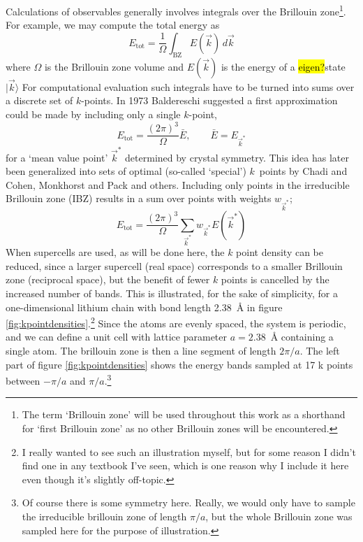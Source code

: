 \documentclass[11pt,bibliography=totoc,index=totoc]{scrbook}   %
\newcommand{\comment}[1]{\hl{#1}}
\begin{document}
Calculations of observables generally involves integrals over the Brillouin zone\footnote{The term `Brillouin zone' will be used throughout this work as
a shorthand for `first Brillouin zone' as no other Brillouin zones will be encountered.}. 
For example, we may compute the total energy as
\begin{equation}
  E_{\text{tot}} = \frac{1}{\Omega} \int_{\text{BZ}} E(\vec{k}) \,d\vec{k}
\end{equation}
where $\Omega$ is the Brillouin zone volume and $E(\vec{k})$ is the energy of a \comment{eigen?}state $|\vec{k}\rangle$
For computational evaluation such integrals have to be turned into sums over a discrete set of $k$-points. 
In 1973 Baldereschi suggested a first approximation could be made by including only a single $k$-point,
\begin{equation}
  E_{\text{tot}} = \frac{(2\pi)^3}{\Omega} \bar{E}, \qquad \bar{E}=E_{\vec{k}^*}
\end{equation}
for a `mean value point' $\vec{k}^*$ determined by crystal symmetry\cite{Baldereschi:1973}. 
This idea has later been generalized into sets of optimal (so-called `special') $k$~points by Chadi and Cohen\cite{Chadi:1973},
Monkhorst and Pack\cite{MonkhorstPack:1976} and others.
Including only points in the irreducible Brillouin zone (IBZ) results in a sum over points with weights $w_{\vec{k}^*}$;
\begin{equation}
  E_{\text{tot}} = \frac{(2\pi)^3}{\Omega}\sum_{\vec{k}^*} w_{\vec{k}^*} E(\vec{k}^*)
\end{equation}
When supercells are used, as will be done here, the $k$ point density can be reduced, since a larger supercell (real space) corresponds to a smaller Brillouin zone (reciprocal space), but the benefit of fewer $k$ points is cancelled by the increased number of bands. 
This is illustrated, for the sake of simplicity, for a one-dimensional 
lithium chain with bond length 2.38~Å in figure \ref{fig:kpointdensities}.\footnote{I really wanted to see such an illustration myself, 
but for some reason I didn't find one in any textbook I've seen, which is one reason why I include it here even though it's slightly off-topic.}
Since the atoms are evenly spaced,
the system is periodic, and we can define a unit cell with lattice parameter 
$a=2.38$~Å containing a single atom. 
The brillouin zone is then a line segment of length $2\pi/a$. 
The left part of figure \ref{fig:kpointdensities} shows the energy bands sampled at 17 k points between $-\pi/a$ and $\pi/a$.\footnote{Of course there is some symmetry here. Really, we would only have to sample the irreducible brillouin zone of length $\pi/a$, but the whole Brillouin zone was sampled here for the purpose of illustration.}
\end{document}

